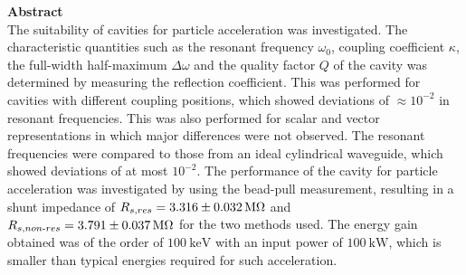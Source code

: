 \documentclass[a4paper]{report}
\numberwithin{equation}{section}
\begin{document}
\begin{titlepage}
	\vspace*{5em}

	\begin{minipage}{0.8\textwidth}
		\begin{centering}
			\textbf{Abstract}\\[0.2cm]
			The suitability of cavities for particle acceleration was investigated. The characteristic quantities such as the 
			resonant frequency $\omega_0$, coupling coefficient $\kappa$, the full-width half-maximum $\Delta\omega$ and the quality factor $Q$ of the 
			cavity was determined by measuring the reflection coefficient. This was performed for cavities with different
			coupling positions, which showed deviations of $\approx 10^{-2}$ in resonant frequencies. This was also performed for scalar and vector representations 
			in which major differences were not observed. The resonant frequencies were compared to those from an ideal cylindrical waveguide,
			which showed deviations of at most $10^{-2}$. The performance of the cavity for particle acceleration was investigated by using the 
			bead-pull measurement, resulting in a shunt impedance of $R_{s, res} = \SI{3.316 \pm 0.032}{\mega\ohm}$ and \
			$R_{s, non\text{-}res} = \SI{3.791 \pm 0.037}{\mega\ohm}$ for the two methods used. The energy gain obtained was of the order of 
			$\SI{100}{\kilo\electronvolt}$ with an input power of $\SI{100}{\kilo\watt}$, which is smaller than typical energies required
			for such acceleration. 
		\end{centering}
	\end{minipage}
	
	
	
	
	
	
	 
	
	
\end{titlepage}
\end{document}
